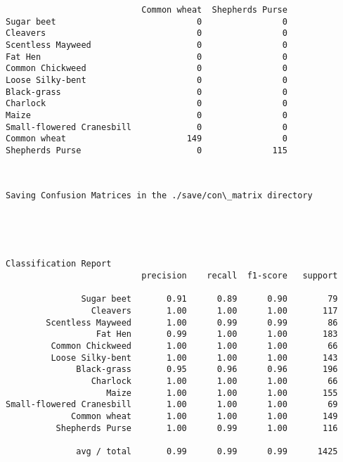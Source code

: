 \documentclass[11pt]{article}
\begin{document}
\begin{verbatim}
                           Common wheat  Shepherds Purse  
Sugar beet                            0                0  
Cleavers                              0                0  
Scentless Mayweed                     0                0  
Fat Hen                               0                0  
Common Chickweed                      0                0  
Loose Silky-bent                      0                0  
Black-grass                           0                0  
Charlock                              0                0  
Maize                                 0                0  
Small-flowered Cranesbill             0                0  
Common wheat                        149                0  
Shepherds Purse                       0              115  
    \end{verbatim}

    
    \begin{Verbatim}[commandchars=\\\{\}]


Saving Confusion Matrices in the ./save/con\_matrix directory

    \end{Verbatim}

    \begin{center}
    \end{center}
    { \hspace*{\fill} \\}
    
    \begin{Verbatim}[commandchars=\\\{\}]


Classification Report
                           precision    recall  f1-score   support

               Sugar beet       0.91      0.89      0.90        79
                 Cleavers       1.00      1.00      1.00       117
        Scentless Mayweed       1.00      0.99      0.99        86
                  Fat Hen       0.99      1.00      1.00       183
         Common Chickweed       1.00      1.00      1.00        66
         Loose Silky-bent       1.00      1.00      1.00       143
              Black-grass       0.95      0.96      0.96       196
                 Charlock       1.00      1.00      1.00        66
                    Maize       1.00      1.00      1.00       155
Small-flowered Cranesbill       1.00      1.00      1.00        69
             Common wheat       1.00      1.00      1.00       149
          Shepherds Purse       1.00      0.99      1.00       116

              avg / total       0.99      0.99      0.99      1425


    \end{Verbatim}
\end{document}
